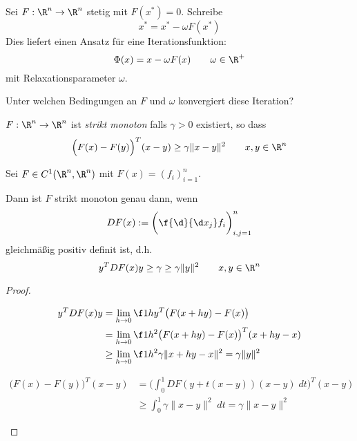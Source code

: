 \documentclass[11pt]{scrartcl}
\begin{document}
\begin{seg}
	Sei $F: \R^n \to \R^n$ stetig mit $F(x^*) = 0$.
	Schreibe
	\[
		x^* = x^* - \omega F(x^*)
	\]
	Dies liefert einen Ansatz für eine Iterationsfunktion:
	\[
		\Phi(x) = x - \omega F(x)
		\qquad \omega \in \R^+
	\]
	mit Relaxationsparameter $\omega$.

	Unter welchen Bedingungen an $F$ und $\omega$ konvergiert diese Iteration?
\end{seg}

\begin{df} \label{3.18}
	$F: \R^n \to \R^n$ ist \emph{strikt monoton} falls $\gamma > 0$ existiert, so dass
	\[
		\Big( F(x) - F(y) \Big)^T (x-y) \ge \gamma \|x-y\|^2
		\qquad x,y \in \R^n
	\]
\end{df}

\begin{lem} \label{3.19}
	Sei $F \in C^1(\R^n, \R^n)$ mit $F(x) = (f_i)_{i=1}^n$.

	Dann ist $F$ strikt monoton genau dann, wenn
	\[
		DF(x) := \bigg( \f{\d}{\d x_j}f_i\bigg)_{i,j=1}^n
	\]
	gleichmäßig positiv definit ist, d.h.
	\[
		y^T DF(x) y \ge \gamma \ge \gamma \|y\|^2 \qquad x,y \in \R^n
	\]
	\begin{proof}
		\begin{seg}[„$\implies$“]
			\begin{align*}
				y^T DF(x) y &= \lim_{h \to 0} \f 1h y^T\big(F(x+hy) - F(x)\big) \\
				&= \lim_{h\to 0} \f 1{h^2} \big( F(x+hy) - F(x)\big)^T(x+hy-x) \\
				&\ge \lim_{h\to 0} \f 1{h^2} \gamma\|x+hy-x\|^2 
				= \gamma\|y\|^2
			\end{align*}
		\end{seg}
		\begin{seg}[„$\Longleftarrow$“]
			\begin{align*}
				\big(F(x) - F(y)\big)^T (x-y) 
				&= \bigg( \int_0^1 DF(y+t(x-y))(x-y) \;dt \bigg)^T(x-y) \\
				&\ge \int_0^1 \gamma \|x-y\|^2 \;dt 
				= \gamma \|x-y\|^2
			\end{align*}
		\end{seg}
	\end{proof}
\end{lem}
\end{document}

